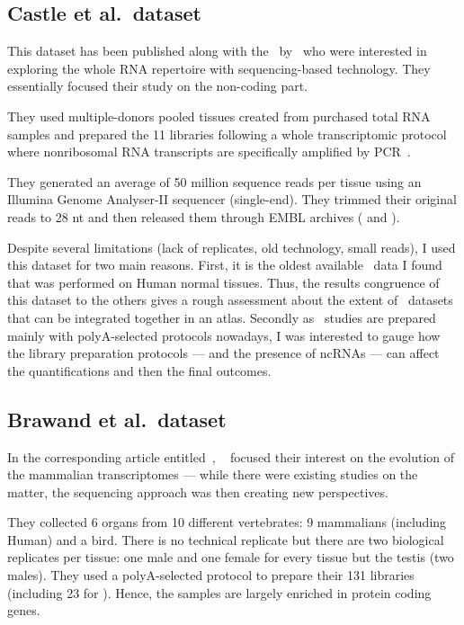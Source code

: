 \subsection{Castle et al.\ dataset}
\label{subsec:castlepresentation}
This dataset has been published along with the~
by~\citet{castleData} who were interested in exploring the whole RNA repertoire
with sequencing-based technology. They essentially focused their study
on the non-coding part.

They used multiple-donors pooled tissues created from purchased total \gls{RNA}
samples and prepared the 11 libraries following a whole transcriptomic protocol
where nonribosomal \gls{RNA} transcripts are
specifically amplified by \gls{PCR}~.

They generated an average of 50 million sequence reads per tissue
using an Illumina Genome Analyser-II sequencer (single-end).
They trimmed their original reads to 28 \gls{nt}
and then released them through EMBL archives (
and ).

Despite several limitations (lack of replicates, old technology, small reads),
I used this dataset for two main reasons. First, it is the oldest available
\Rnaseq\ data I found that was performed on Human normal tissues. Thus, the
results congruence of this dataset to the others gives a rough assessment about
the extent of \Rnaseq\ datasets that can be integrated together in an atlas.
Secondly as \Rnaseq\ studies are prepared mainly with polyA-selected protocols
nowadays, I was interested to gauge how the library preparation
protocols --- and the presence of \glspl{ncRNA} --- can affect the
quantifications and then the final outcomes.


\subsection{Brawand et al.\ dataset}
\label{subsec:brawandpresentation}
In the corresponding article entitled~,%
~\citet{VTpaper} focused their interest on the
evolution of the mammalian transcriptomes --- while there were existing studies
on the matter, the sequencing approach was then creating new perspectives.

They collected 6 organs from 10 different vertebrates:
9 mammalians (including Human) and a bird. There is no technical replicate
but there are two biological replicates per tissue:
one male and one female for every tissue but the testis (two males).
They used a polyA-selected protocol to prepare their 131 libraries (including 23
for ).
Hence, the samples are largely enriched in protein coding genes.

